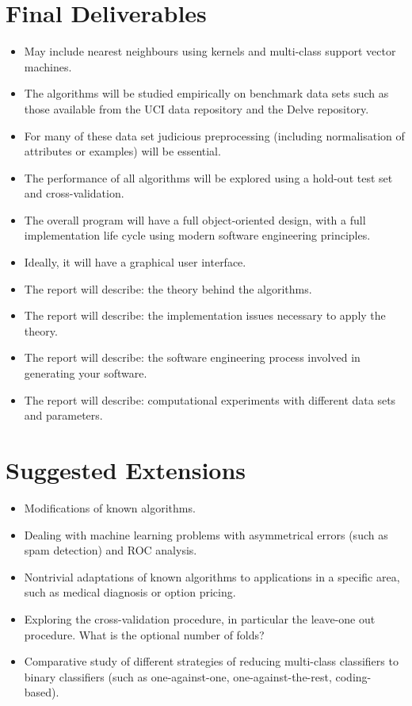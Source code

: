\documentclass[]{final_report}
\begin{document}
\section*{Final Deliverables}
\begin{itemize}
  \item May include nearest neighbours using kernels and multi-class support vector machines.
  \item The algorithms will be studied empirically on benchmark data sets such as those available from the UCI data repository and the Delve repository.
  \item For many of these data set judicious preprocessing (including normalisation of attributes or examples) will be essential.
  \item The performance of all algorithms will be explored using a hold-out test set and cross-validation.
  \item The overall program will have a full object-oriented design, with a full implementation life cycle using modern software engineering principles.
  \item Ideally, it will have a graphical user interface.
  \item The report will describe: the theory behind the algorithms.
  \item The report will describe: the implementation issues necessary to apply the theory.
  \item The report will describe: the software engineering process involved in generating your software.
  \item The report will describe: computational experiments with different data sets and parameters.
\end{itemize}

\section*{Suggested Extensions}
\begin{itemize}
  \item Modifications of known algorithms.
  \item Dealing with machine learning problems with asymmetrical errors (such as spam detection) and ROC analysis.
  \item Nontrivial adaptations of known algorithms to applications in a specific area, such as medical diagnosis or option pricing.
  \item Exploring the cross-validation procedure, in particular the leave-one out procedure. What is the optional number of folds?
  \item Comparative study of different strategies of reducing multi-class classifiers to binary classifiers (such as one-against-one, one-against-the-rest, coding-based).
\end{itemize}
\end{document}
